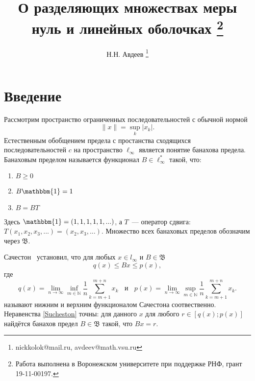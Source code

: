 \documentclass[a4paper,14pt]{article} %
\theoremstyle{plain}
\begin{document}

\title{
	О разделяющих множествах меры нуль и линейных оболочках
	\footnote{
		Работа выполнена в Воронежском университете при поддержке РНФ, грант 19-11-00197.
	}
}

\author{
	Н.Н. Авдеев
	\footnote{nickkolok@mail.ru, avdeev@math.vsu.ru}
}

\maketitle

\section{Введение}

Рассмотрим пространство ограниченных последовательностей с обычной нормой
\begin{equation*}
	\|x\| = \sup_{k} |x_k|
	.
\end{equation*}
Естественным обобщением предела с простанства сходящихся последовательностей $c$ на пространство $\ell_\infty$
является понятие банахова предела.
Банаховым пределом называется функционал $B\in \ell_\infty^*$ такой, что:
\begin{enumerate}
	\item
		$B \geqslant 0$
	\item
		$B\mathbbm{1} = 1$
	\item
		$B=BT$
\end{enumerate}
Здесь $\mathbbm{1}=(1,1,1,1,1,...)$,
а $T$~--- оператор сдвига: $T(x_1, x_2, x_3, ...) = (x_2, x_3, ...)$.
Множество всех банаховых пределов обозначим через $\mathfrak{B}$.

Сачестон~\cite{sucheston1967banach} установил, что
для любых $x\in l_\infty$ и $B\in\mathfrak{B}$
\begin{equation}\label{Sucheston}
	q(x) \leqslant Bx \leqslant p(x)
	,
\end{equation}
где
\begin{equation*}
	q(x) = \lim_{n\to\infty} \inf_{m\in\mathbb{N}}  \frac{1}{n} \sum_{k=m+1}^{m+n} x_k
	~~~~\mbox{и}~~~~
	p(x) = \lim_{n\to\infty} \sup_{m\in\mathbb{N}}  \frac{1}{n} \sum_{k=m+1}^{m+n} x_k
	.
\end{equation*}
называют нижним и верхним функционалом Сачестона соотвественно.
Неравенства \eqref{Sucheston} точны:
для данного $x$ для любого $r\in[q(x); p(x)]$ найдётся банахов предел
$B\in\mathfrak{B}$ такой, что $Bx = r$.
\end{document}
